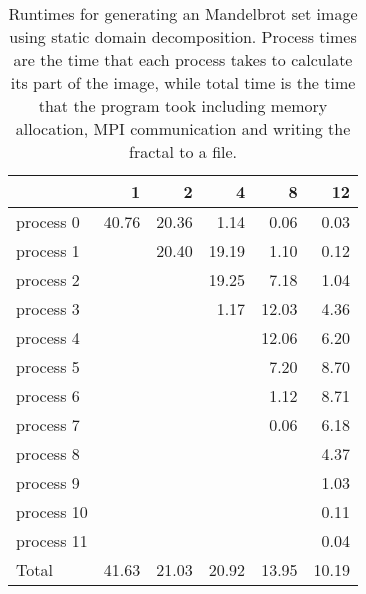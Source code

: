 \documentclass[a4paper]{article}
\begin{document}
\begin{table}[h]
	\centering
	\caption{Runtimes for generating an Mandelbrot set image using static domain decomposition. Process times are the time that each process takes to calculate its part of the image, while total time is the time that the program took including memory allocation, MPI communication and writing the fractal to a file.}
	\label{tbl:mandelbrot}
	\begin{tabular}{l|r|r|r|r|r}
		& 1 & 2 & 4 & 8 & 12 \\ \hline
		process 0  & 40.76 & 20.36 &  1.14 &  0.06 &  0.03 \\
		process 1  &       & 20.40 & 19.19 &  1.10 &  0.12 \\
		process 2  &       &       & 19.25 &  7.18 &  1.04 \\
		process 3  &       &       &  1.17 & 12.03 &  4.36 \\
		process 4  &       &       &       & 12.06 &  6.20 \\
		process 5  &       &       &       &  7.20 &  8.70 \\
		process 6  &       &       &       &  1.12 &  8.71 \\
		process 7  &       &       &       &  0.06 &  6.18 \\
		process 8  &       &       &       &       &  4.37 \\
		process 9  &       &       &       &       &  1.03 \\
		process 10 &       &       &       &       &  0.11 \\
		process 11 &       &       &       &       &  0.04 \\ \hline
		Total      & 41.63 & 21.03 & 20.92 & 13.95 & 10.19
	\end{tabular}
\end{table}
\end{document}
